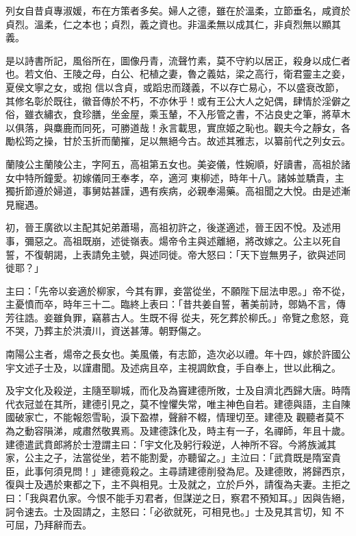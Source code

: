 
\begin{pinyinscope}

 列女自昔貞專淑媛，布在方策者多矣。婦人之德，雖在於溫柔，立節垂名，咸資於貞烈。溫柔，仁之本也；貞烈，義之資也。非溫柔無以成其仁，非貞烈無以顯其義。



 是以詩書所記，風俗所在，圖像丹青，流聲竹素，莫不守約以居正，殺身以成仁者也。若文伯、王陵之母，白公、杞植之妻，魯之義姑，梁之高行，衛君靈主之妾，夏侯文寧之女，或抱
 信以含貞，或蹈忠而踐義，不以存亡易心，不以盛衰改節，其修名彰於既往，徽音傳於不朽，不亦休乎！或有王公大人之妃偶，肆情於淫僻之俗，雖衣繡衣，食珍膳，坐金屋，乘玉輦，不入彤管之書，不沾良史之筆，將草木以俱落，與麋鹿而同死，可勝道哉！永言載思，實庶姬之恥也。觀夫今之靜女，各勵松筠之操，甘於玉折而蘭摧，足以無絕今古。故述其雅志，以纂前代之列女云。



 蘭陵公主蘭陵公主，字阿五，高祖第五女也。美姿儀，性婉順，好讀書，高祖於諸女中特所鐘愛。初嫁儀同王奉孝，卒，適河
 東柳述，時年十八。諸姊並驕貴，主獨折節遵於婦道，事舅姑甚謹，遇有疾病，必親奉湯藥。高祖聞之大悅。由是述漸見寵遇。



 初，晉王廣欲以主配其妃弟蕭瑒，高祖初許之，後遂適述，晉王因不悅。及述用事，彌惡之。高祖既崩，述徙嶺表。煬帝令主與述離絕，將改嫁之。公主以死自誓，不復朝謁，上表請免主號，與述同徙。帝大怒曰：「天下豈無男子，欲與述同徙耶？」



 主曰：「先帝以妾適於柳家，今其有罪，妾當從坐，不願陛下屈法申恩。」帝不從，主憂憤而卒，時年三十二。臨終上表曰：「昔共姜自誓，著美前詩，鄎媯不言，傳芳往誥。妾雖負罪，竊慕古人。生既不得
 從夫，死乞葬於柳氏。」帝覽之愈怒，竟不哭，乃葬主於洪瀆川，資送甚薄。朝野傷之。



 南陽公主者，煬帝之長女也。美風儀，有志節，造次必以禮。年十四，嫁於許國公宇文述子士及，以謹肅聞。及述病且卒，主視調飲食，手自奉上，世以此稱之。



 及宇文化及殺逆，主隨至聊城，而化及為竇建德所敗，士及自濟北西歸大唐。時隋代衣冠並在其所，建德引見之，莫不惶懼失常，唯主神色自若。建德與語，主自陳國破家亡，不能報怨雪恥，淚下盈襟，聲辭不輟，情理切至。建德及
 觀聽者莫不為之動容隕涕，咸肅然敬異焉。及建德誅化及，時主有一子，名禪師，年且十歲。建德遣武賁郎將於士澄謂主曰：「宇文化及躬行殺逆，人神所不容。今將族滅其家，公主之子，法當從坐，若不能割愛，亦聽留之。」主泣曰：「武賁既是隋室貴臣，此事何須見問！」建德竟殺之。主尋請建德削發為尼。及建德敗，將歸西京，復與士及遇於東都之下，主不與相見。士及就之，立於戶外，請復為夫妻。主拒之曰：「我與君仇家。今恨不能手刃君者，但謀逆之日，察君不預知耳。」因與告絕，訶令速去。士及固請之，主怒曰：「必欲就死，可相見也。」士及見其言切，知
 不可屈，乃拜辭而去。




\end{pinyinscope}
